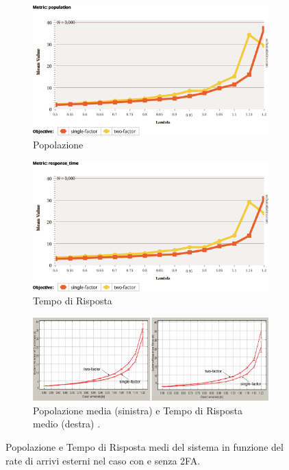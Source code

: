 \begin{figure}
    \centering
    \begin{subfigure}[b]{0.49\linewidth}
        \includegraphics[width=1\linewidth]{figs/results/obj2/validation/single_VS_Two_FA_Perfomance_Comparison_population.png}
        \caption{Popolazione}
        \label{fig:Single_VS_Two_FA_Perfomance_Comparison_population}
    \end{subfigure}
    \hfill
    \begin{subfigure}[b]{0.49\linewidth}
        \includegraphics[width=1\linewidth]{figs/results/obj2/validation/single_VS_Two_FA_Perfomance_Comparison_rtime.png}
        \caption{Tempo di Risposta}
        \label{fig:Single_VS_Two_FA_Perfomance_Comparison_rtime}
    \end{subfigure}
    \hfill
    \begin{subfigure}{1\linewidth}
        \centering
        \includegraphics[width=1\linewidth]{figs//results//obj2//validation/casestudy_system_rtime_population.png}
        \caption{Popolazione media (sinistra) e Tempo di Risposta medio (destra) \citep{DBLP:books/sp/Serazzi24}.}
        \label{fig:casestudy_system_rtime_population}
    \end{subfigure}
    \caption{Popolazione e Tempo di Risposta medi del sistema in funzione del rate di arrivi esterni nel caso con e senza 2FA.}
    \label{fig:Single_VS_Two_FA_Perfomance_Comparison}
\end{figure}